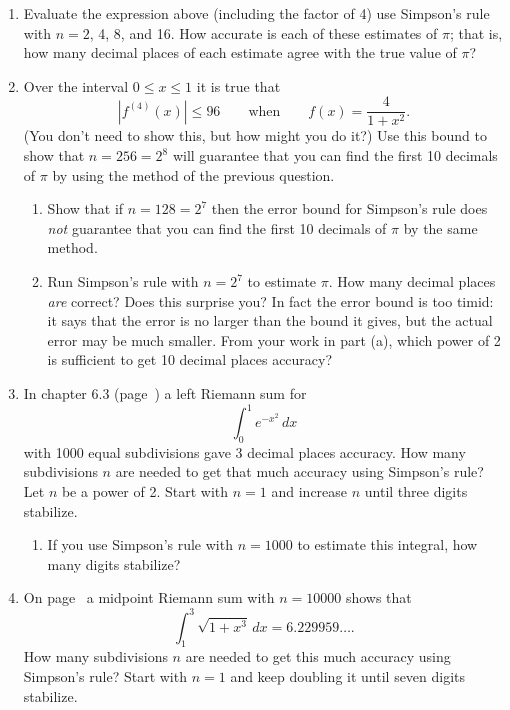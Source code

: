 \begin{enumerate}
\item Evaluate the expression above (including the factor of 4) use
Simpson's rule with $n = 2$, 4, 8, and 16.  How accurate is each of
these estimates of $\pi$; that is, how many decimal places of each
estimate agree with the true value of $\pi$?


\item Over the interval $0 \leq x \leq 1$ it is true that
\[
|f^{(4)}(x)| \leq 96 \qquad \mbox{when} \qquad f(x) = \dfrac{4}{1+x^2}.
\]
(You don't need to show this, but how might you do it?)  Use this
bound to show that $n = 256 = 2^8$ will guarantee that you can find
the first 10 decimals of $\pi$ by using the method of the previous
question.

  \begin{enumerate}
  \item Show that if $n = 128 = 2^7$ then the error bound for Simpson's
rule does {\em not\/} guarantee that you can find the first 10
decimals of $\pi$ by the same method.

  \item Run Simpson's rule with $n = 2^7$ to estimate $\pi$.  How many
decimal places {\em are\/} correct?  Does this surprise you?  In fact
the error bound is too timid: it says that the error is no larger than
the bound it gives, but the actual error may be much smaller.  From
your work in part (a), which power of 2 is sufficient to get 10
decimal places accuracy?


\end{enumerate}
\item In chapter 6.3 (page~\pageref{int error}) a left Riemann sum for
\[
\int_0^1 e^{-x^2} \, dx
\] 
with 1000 equal subdivisions gave 3 decimal places accuracy.  How many
subdivisions $n$ are needed to get that much accuracy using Simpson's
rule?  Let $n$ be a power of 2.  Start with $n = 1$ and increase $n$
until three digits stabilize.

  \begin{enumerate}
  \item If you use Simpson's rule with $n = 1000$ to estimate this
integral, how many digits stabilize?


\end{enumerate}
\item On page~\pageref{midpoint for x-cube} a midpoint Riemann sum with
$n = 10000$ shows that
\[
\int_1^3 \sqrt{1 + x^3} \, dx = 6.229959\ldots .
\]
How many subdivisions $n$ are needed to get this much accuracy using
Simpson's rule?  Start with $n = 1$ and keep doubling it until seven
digits stabilize.


\end{enumerate}
